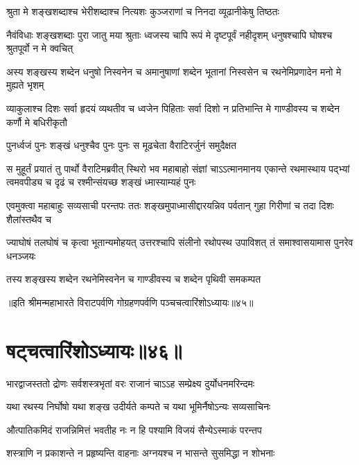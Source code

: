 


\twolineshloka
{श्रुता मे शङ्खशब्दाश्च भेरीशब्दाश्च नित्यशः}
{कुञ्जराणां च निनदा व्यूढानीकेषु तिष्ठतः}


\threelineshloka
{नैवंविधाः शङ्खशब्दाः पुरा जातु मया श्रुताः}
{ध्वजस्य चापि रूपं मे दृष्टपूर्वं नहीदृशम्}
{धनुषश्चापि घोषश्च श्रुतपूर्वो न मे क्वचित्}


\threelineshloka
{अस्य शङ्खस्य शब्देन धनुषो निस्वनेन च}
{अमानुषाणां शब्देन भूतानां निस्वसेन च}
{रथनेमिप्रणादेन मनो मे मुह्यते भृशम्}


\threelineshloka
{व्याकुलाश्च दिशः सर्वा हृदयं व्यथतीव च}
{ध्वजेन पिहिताः सर्वा दिशो न प्रतिभान्ति मे}
{गाण्डीवस्य च शब्देन कर्णौ मे बधिरीकृतौ}



\twolineshloka
{पुनर्ध्वजं पुनः शङ्खं धनुश्चैव पुनः पुनः}
{स मूढचेता वैराटिरर्जुनं समुदैक्षत}


\onelineshloka
{स मुहूर्तं प्रयातं तु पार्थो वैराटिमब्रवीत्}
\threelineshloka
{स्थिरो भव महाबाहो संज्ञां चाऽऽत्मानमानय}
{एकान्ते रथमास्थाय पद्भ्यां त्वमवपीड्य च}
{दृढं च रश्मीन्संयच्छ शङ्खं ध्मास्याम्यहं पुनः}


\threelineshloka
{एवमुक्त्वा महाबाहुः सव्यसाची परन्तपः}
{ततः शङ्खमुपाध्मासीद्दारयन्निव पर्वतान्}
{गुहा गिरीणां च तदा दिशः शैलांस्तथैव च}


\threelineshloka
{ज्याघोषं तलघोषं च कृत्वा भूतान्यमोहयत्}
{उत्तरश्चापि संलीनो रथोपस्थ उपाविशत्}
{तं समाश्वासयामास पुनरेव धनञ्जयः}


\twolineshloka
{तस्य शङ्खस्य शब्देन रथनेमिस्वनेन च}
{गाण्डीवस्य च शब्देन पृथिवी समकम्पत}

॥इति श्रीमन्महाभारते विराटपर्वणि गोग्रहणपर्वणि पञ्चचत्वारिंशोऽध्यायः॥४५॥

\chapter{षट्चत्वारिंशोऽध्यायः॥४६॥}

\twolineshloka
{भारद्वाजस्ततो द्रोणः सर्वशस्त्रभृतां वरः}
{राजानं चाऽऽह सम्प्रेक्ष्य दुर्योधनमरिन्दमः}


\twolineshloka
{यथा रथस्य निर्घोषो यथा शङ्ख उदीर्यते}
{कम्पते च यथा भूमिर्नैषोऽन्यः सव्यसाचिनः}


\twolineshloka
{औत्पातिकमिदं राजन्निमित्तं भवतीह नः}
{न हि पश्यामि विजयं सैन्येऽस्माकं परन्तप}


\twolineshloka
{शस्त्राणि न प्रकाशन्ते न प्रहृष्यन्ति वाहनाः}
{अग्नयश्च न भासन्ते सुसमिद्धा न शोभनाः}


